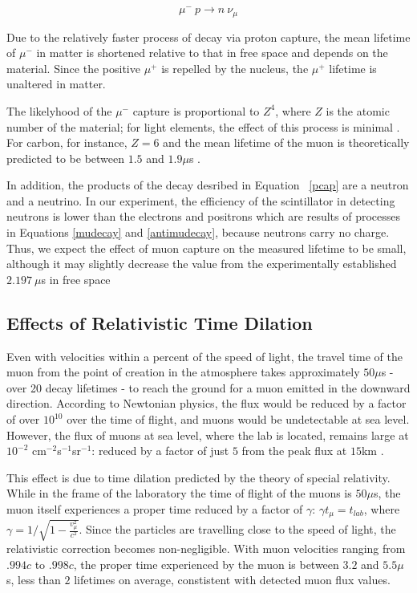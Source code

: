 \begin{equation}\mu^-~p \rightarrow n~\nu_{\mu} \label{pcap} \end{equation}

Due to the relatively faster process of decay via proton capture, the
mean lifetime of $\mu^-$ in matter is shortened relative to that in
free space and depends on the material. Since the positive $\mu^+$ is
repelled by the nucleus, the $\mu^+$ lifetime is unaltered in matter.

The likelyhood of the $\mu^-$ capture is proportional to $Z^4$, where
$Z$ is the atomic number of the material; for light elements, the
effect of this process is minimal \cite[p.172]{rossi}. For carbon, for
instance, $Z=6$ and the mean lifetime of the muon is theoretically
predicted to be between $1.5$ and $1.9\mu$s \cite[p.~170]{rossi}.

In addition, the products of the decay desribed in Equation
~\eqref{pcap} are a neutron and a neutrino. In our experiment, the
efficiency of the scintillator in detecting neutrons is lower than the
electrons and positrons which are results of processes in Equations
\eqref{mudecay} and \eqref{antimudecay}, because neutrons carry no
charge. Thus, we expect the effect of muon capture on the measured
lifetime to be small, although it may slightly decrease the value from
the experimentally established $2.197~\mu$s in free space \cite{pdg}

\subsection{Effects of Relativistic Time Dilation}

Even with velocities within a percent of the speed of light, the
travel time of the muon from the point of creation in the atmosphere
takes approximately $50\mu$s - over 20 decay lifetimes - to reach the
ground for a muon emitted in the downward direction. According to
Newtonian physics, the flux would be reduced by a factor of over
$10^{10}$ over the time of flight, and muons would be undetectable at
sea level. However, the flux of muons at sea level, where the lab is
located, remains large at $10^{-2}$ cm$^{-2}$s$^{-1}$sr$^{-1}$:
reduced by a factor of just $5$ from the peak flux at $15$km
\cite{rossi}.

This effect is due to time dilation predicted by the theory of special
relativity. While in the frame of the laboratory the time of flight of
the muons is $50\mu$s, the muon itself experiences a proper time
reduced by a factor of $\gamma$: $ \gamma t_{\mu} = t_{lab}$, where
$\gamma = 1/\sqrt{1 - \frac{v_{\mu}^2}{c^2}}$. Since the particles are
travelling close to the speed of light, the relativistic correction
becomes non-negligible. With muon velocities ranging from $.994c$ to
$.998c$, the proper time experienced by the muon is between $3.2$ and
$5.5\mu$s, less than $2$ lifetimes on average, constistent with
detected muon flux values.

